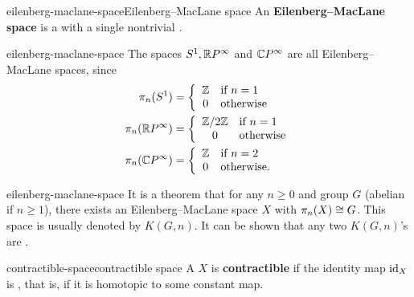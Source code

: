\begin{topic}{eilenberg-maclane-space}{Eilenberg--MacLane space}
    An \textbf{Eilenberg--MacLane space} is a  with a single nontrivial .
\end{topic}

\begin{example}{eilenberg-maclane-space}
    The spaces $S^1, \mathbb{R} P^\infty$ and $\mathbb{C} P^\infty$ are all Eilenberg--MacLane spaces, since
    \[ \begin{aligned}
        \pi_n(S^1) &= \left\{ \begin{array}{cl} \mathbb{Z} & \text{if } n = 1 \\ 0 & \text{otherwise} \end{array} \right. \\
        \pi_n(\mathbb{R} P^\infty) &= \left\{ \begin{array}{cl} \mathbb{Z}/2\mathbb{Z} & \text{if } n = 1 \\ 0 & \text{otherwise} \end{array} \right. \\
        \pi_n(\mathbb{C} P^\infty) &= \left\{ \begin{array}{cl} \mathbb{Z} & \text{if } n = 2 \\ 0 & \text{otherwise} . \end{array} \right.
    \end{aligned} \]
\end{example}

\begin{example}{eilenberg-maclane-space}
    It is a theorem that for any $n \ge 0$ and group $G$ (abelian if $n \ge 1$), there exists an Eilenberg--MacLane space $X$ with $\pi_n(X) \cong G$. This space is usually denoted by $K(G, n)$. It can be shown that any two $K(G, n)$'s are .
\end{example}

\begin{topic}{contractible-space}{contractible space}
    A  $X$ is \textbf{contractible} if the identity map $\textup{id}_X$ is , that is, if it is homotopic to some constant map.
\end{topic}

